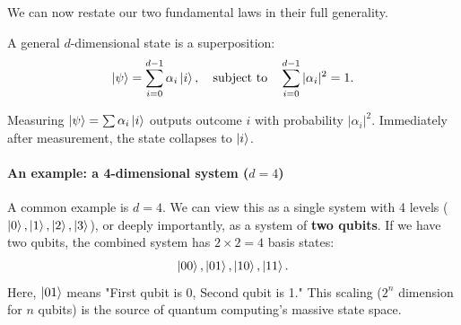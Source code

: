 We can now restate our two fundamental laws in their full generality.

\begin{definition}
A general $d$-dimensional state is a superposition:
\[
    \ket{\psi} = \sum_{i=0}^{d-1} \alpha_i \ket{i}, \quad \text{subject to} \quad \sum_{i=0}^{d-1} |\alpha_i|^2 = 1.
\]
\end{definition}

\begin{definition}
Measuring $\ket{\psi} = \sum \alpha_i \ket{i}$ outputs outcome $i$ with probability $|\alpha_i|^2$.
Immediately after measurement, the state collapses to $\ket{i}$.
\end{definition}

\paragraph{An example: a 4-dimensional system \texorpdfstring{($d=4$)}{(d=4)}}

A common example is $d=4$. We can view this as a single system with 4 levels ($\ket{0}, \ket{1}, \ket{2}, \ket{3}$), or deeply importantly, as a system of \textbf{two qubits}.
If we have two qubits, the combined system has $2 \times 2 = 4$ basis states:
\[
    \ket{00}, \ket{01}, \ket{10}, \ket{11}.
\]
Here, $\ket{01}$ means "First qubit is 0, Second qubit is 1." This scaling ($2^n$ dimension for $n$ qubits) is the source of quantum computing's massive state space.



% 
% 

% 
